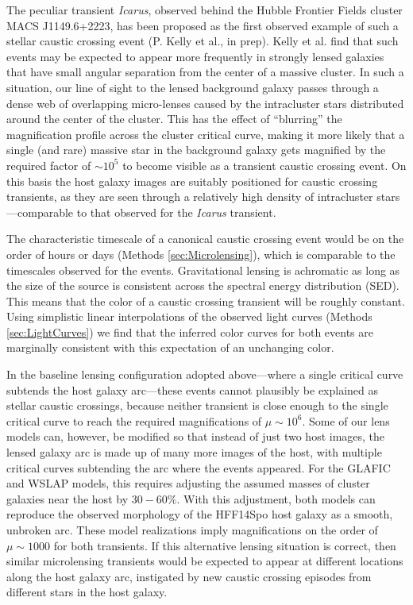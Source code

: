 The peculiar transient {\it Icarus}, observed behind the Hubble
Frontier Fields cluster MACS J1149.6+2223, has been proposed as the
first observed example of such a stellar caustic crossing event
(P. Kelly et al., in prep). Kelly et al. find that such events may be
expected to appear more frequently in strongly lensed galaxies that
have small angular separation from the center of a massive cluster. In
such a situation, our line of sight to the lensed background galaxy
passes through a dense web of overlapping micro-lenses caused by the
intracluster stars distributed around the center of the cluster. This
has the effect of ``blurring'' the magnification profile across the
cluster critical curve, making it more likely that a single (and rare)
massive star in the background galaxy gets magnified by the required
factor of $\sim10^5$ to become visible as a transient caustic crossing
event.  On this basis the \spock host galaxy images are suitably
positioned for caustic crossing transients, as they are seen through a
relatively high density of intracluster stars---comparable to that
observed for the {\it Icarus} transient.

The characteristic timescale of a canonical caustic crossing event
would be on the order of hours or days (Methods
\ref{sec:Microlensing}), which is comparable to the timescales
observed for the \spock events. Gravitational lensing is achromatic as
long as the size of the source is consistent across the spectral
energy distribution (SED).  This means that the color of a caustic
crossing transient will be roughly constant.  Using simplistic linear
interpolations of the observed light curves (Methods
\ref{sec:LightCurves}) we find that the inferred color curves for both
\spock events are marginally consistent with this expectation of an
unchanging color.

In the baseline lensing configuration adopted above---where a single
critical curve subtends the \spock host galaxy arc---these events
cannot plausibly be explained as stellar caustic crossings, because
neither transient is close enough to the single critical curve to
reach the required magnifications of $\mu\sim10^6$.  Some of our lens
models can, however, be modified so that instead of just two host
images, the lensed galaxy arc is made up of many more images of the
host, with multiple critical curves subtending the arc where the
\spock events appeared.  For the GLAFIC and WSLAP models, this
requires adjusting the assumed masses of cluster galaxies near the
\spock host by $30-60\%$.
With this adjustment, both models can reproduce the observed
morphology of the HFF14Spo host galaxy as a smooth, unbroken arc.
These model realizations imply magnifications on the order of
$\mu\sim1000$ for both \spock transients. If this alternative lensing
situation is correct, then similar microlensing transients would be
expected to appear at different locations along the host galaxy arc,
instigated by new caustic crossing episodes from different stars in
the host galaxy.

